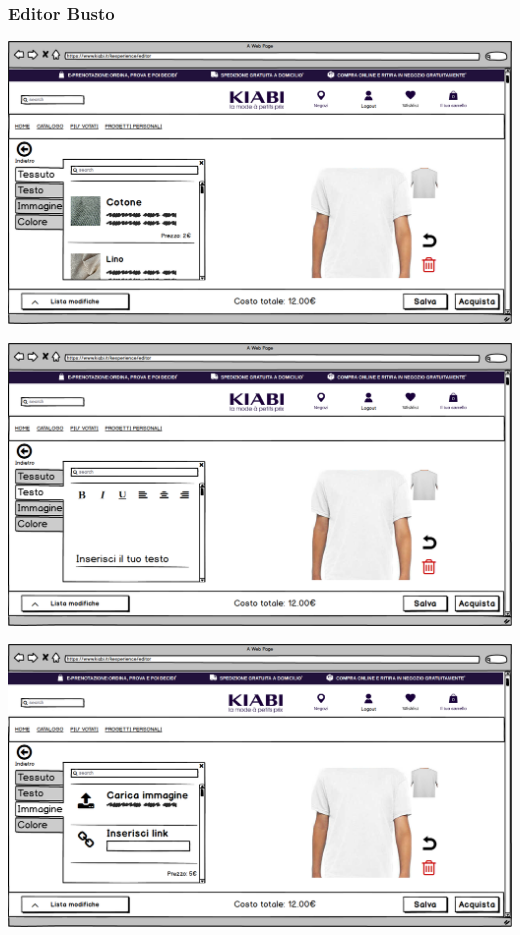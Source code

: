 \documentclass[12pt,italian,]{report}
\begin{document}
\subsubsection{Editor Busto} 
\includegraphics{balsamiq/Editor - caratteristica busto tessuto.png}


\includegraphics{balsamiq/Editor - caratteristica busto testo.png}


\includegraphics{balsamiq/Editor - caratteristica busto immagine.png}
\end{document}
